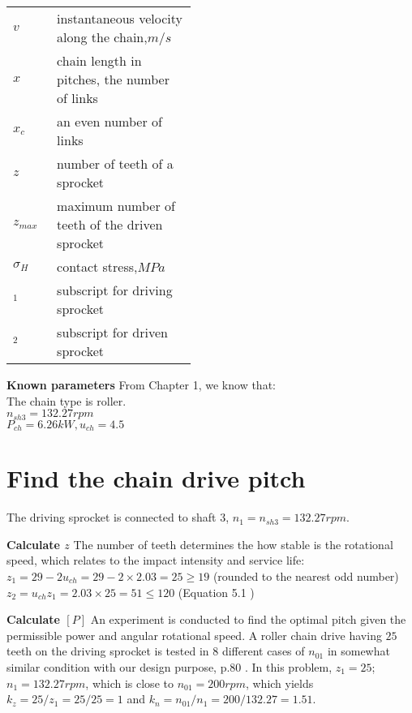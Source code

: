 \begin{tabular}[t]{p{0.05\linewidth}p{0.4\linewidth}}
	$ v $ & instantaneous velocity along the chain,$ \unit{m/s} $\\
	$ x $ & chain length in pitches, the number of links\\
	$ x_c $ & an even number of links\\
	$ z $ & number of teeth of a sprocket\\
	$ z_{max} $ & maximum number of teeth of the driven sprocket\\
	$ \sigma_H $ & contact stress,$ \unit{MPa} $\\
	$ _1 $  & subscript for driving sprocket\\
	$ _2 $  & subscript for driven sprocket\\
\end{tabular}

\textbf{Known parameters} From Chapter 1, we know that:\\
The chain type is roller.\\
$ n_{sh3}= 132.27 \unit{rpm}$\\
$ P_{ch} = 6.26\unit{kW}, u_{ch}=4.5 $

\section{Find the chain drive pitch}
The driving sprocket is connected to shaft 3, $ n_1 = n_{sh3} = 132.27\unit{rpm} $.

\textbf{Calculate $ z $}
The number of teeth determines the how stable is the rotational speed, which relates to the impact intensity and service life:\\
$ z_1 = 29 - 2u_{ch} = 29 - 2 \times 2.03 = 25 \geq 19 $ (rounded to the nearest odd number)\\
$ z_2 = u_{ch}z_1 = 2.03 \times 25 = 51 \leq 120$ (Equation 5.1 \cite{tk1})

\textbf{Calculate $ [P] $} An experiment is conducted to find the optimal pitch given the permissible power and angular rotational speed. A roller chain drive having $ 25 $ teeth on the driving sprocket is tested in 8 different cases of $ n_{01} $ in somewhat similar condition with our design purpose, p.80 \cite{tk1}. In this problem, $ z_1=25 $; $ n_1=132.27\unit{rpm} $, which is close to $ n_{01}=200\unit{rpm} $, which yields $ k_z = {25}/{z_1} = 25/25 = 1 $ and $  k_n = {n_{01}}/{n_{1}} = 200/132.27 = 1.51 $. 

